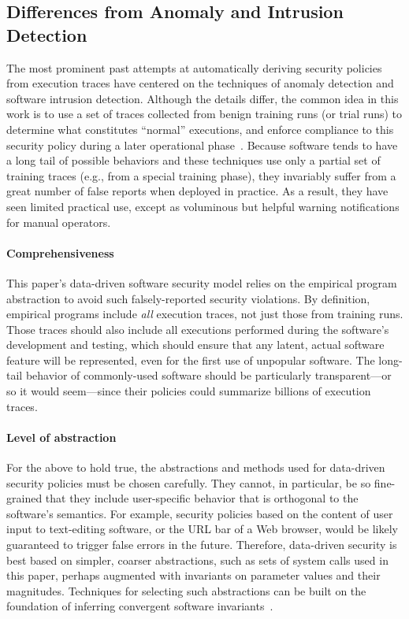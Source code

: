 \documentclass{IEEEtran}
\begin{document}
\subsection{Differences from Anomaly and Intrusion Detection}
The most prominent past attempts 
at automatically deriving security policies from execution traces
have centered on the
techniques of anomaly detection and software intrusion detection.
Although the details differ,
the common idea in this work is
to use a set of traces collected from benign training runs (or trial runs)
to determine what constitutes ``normal'' executions,
and enforce compliance to this security policy 
during a later operational phase~\cite{Denning,AnomalySurveyTwo}.
Because 
software tends to have a long tail of possible behaviors
and
these techniques use only a partial set of training traces
(e.g., from a special training phase),
they invariably suffer from a great number of false reports
when deployed in practice.
As a result,
they have seen limited practical use,
except as voluminous but helpful warning notifications for manual operators.

\paragraph*{Comprehensiveness}
This paper's data-driven software security model 
relies on the empirical program abstraction to
avoid such falsely-reported security violations.
By definition, empirical programs include \emph{all} execution traces,
not just those from training runs.
Those traces should also include all executions 
performed during the software's development and testing,
which should ensure that any latent, actual software feature will be represented,
even for the first use of unpopular software.
The long-tail behavior of commonly-used software
should be particularly transparent---or so it would seem---since
their policies could summarize
billions of execution traces.


\paragraph*{Level of abstraction}
For the above to hold true,
the abstractions and methods used for data-driven security policies  
must be chosen carefully.
They cannot, in particular, be so fine-grained
that they include user-specific behavior that is orthogonal to the software's semantics.
For example,
security policies 
based on the content of user input to text-editing software,
or the URL bar of a Web browser,
would be likely guaranteed to trigger false errors in the future.
Therefore,
data-driven security is best based on simpler, coarser abstractions,
such as sets of system calls used in this paper,
perhaps augmented with invariants on parameter values and their magnitudes.
Techniques for selecting such abstractions 
can be
built on the foundation of inferring convergent software invariants~\cite{Daikon,Diduce}.
\end{document}

